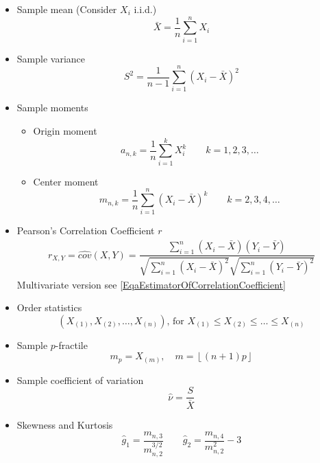     \begin{itemize}
        \item Sample mean (Consider $X_i$ i.i.d.)
        \begin{equation}
            \bar{X}=\frac{1}{n}\sum_{i=1}^n X_i
        \end{equation}
        \item Sample variance
        \begin{equation}
            S^2=\frac{1}{n-1}\sum_{i=1}^n(X_i-\bar{X})^2  
        \end{equation}
        \item Sample moments
        \begin{itemize}
            \item Origin moment
            \begin{equation}
                a_{n,k}=\frac{1}{n}\sum_{i=1}^k X_i^k\qquad k=1,2,3,\ldots    
            \end{equation}
            \item Center moment
            \begin{equation}
                m_{n,k}=\frac{1}{n}\sum_{i=1}^n (X_i-\bar{X})^k\qquad k=2,3,4,\ldots    
            \end{equation}
        \end{itemize}
        \item Pearson's Correlation Coefficient $ r $
        \begin{align}
            r_{X,Y}=\hat{cov}(X,Y)=\dfrac{\sum_{i=1}^n(X_i-\bar{X})(Y_i-\bar{Y})}{\sqrt{\sum_{i=1}^n(X_i-\bar{X})^2}\sqrt{\sum_{i=1}^n(Y_i-\bar{Y})^2}} 
        \end{align}        
        Multivariate version see \autoref{EqaEstimatorOfCorrelationCoefficient}
        \item Order statistics
        \begin{equation}
            (X_{(1)},X_{(2)},\ldots,X_{(n)}),\,\text{for }X_{(1)}\leq X_{(2)} \leq \ldots\leq X_{(n)}    
        \end{equation}
        \item Sample $p$-fractile
        \begin{equation}
            m_p=X_{(m)},\quad m=\left\lfloor (n+1)p\right\rfloor    
        \end{equation}
        \item Sample coefficient of variation
        \begin{equation}
            \hat{\nu}=\frac{S}{\bar{X}}    
        \end{equation}
        \item Skewness and Kurtosis
        \begin{equation}
            \hat{g}_1=\frac{m_{n,3}}{m_{n,2}^{3/2}}\qquad \hat{g}_2=\frac{m_{n,4}}{m_{n,2}^2}    -3
        \end{equation}
    \end{itemize}

